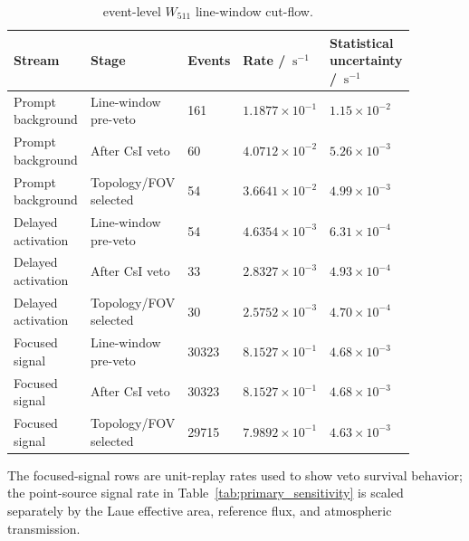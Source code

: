 \documentclass[11pt]{article}
\newcommand{\cps}{\ensuremath{\,\mathrm{s^{-1}}}}
\newcommand{\wii}{W_{511}}
\newcommand{\added}[1]{{\color{red}#1}}
\begin{document}
\begin{table}[t]
\centering
\caption{\added{event-level $\wii$ line-window cut-flow.}}
\label{tab:phase2_cutflow}
\footnotesize
{
\setlength{\tabcolsep}{3pt}
\begin{tabular}{p{0.20\linewidth}p{0.24\linewidth}p{0.08\linewidth}p{0.16\linewidth}p{0.20\linewidth}}
\toprule
Stream & Stage & Events & Rate / $\cps$ & Statistical uncertainty / $\cps$ \\
\midrule
Prompt background & Line-window pre-veto & 161 & $1.1877\times10^{-1}$ & $1.15\times10^{-2}$ \\
Prompt background & After CsI veto & 60 & $4.0712\times10^{-2}$ & $5.26\times10^{-3}$ \\
Prompt background & Topology/FOV selected & 54 & $3.6641\times10^{-2}$ & $4.99\times10^{-3}$ \\
Delayed activation & Line-window pre-veto & 54 & $4.6354\times10^{-3}$ & $6.31\times10^{-4}$ \\
Delayed activation & After CsI veto & 33 & $2.8327\times10^{-3}$ & $4.93\times10^{-4}$ \\
Delayed activation & Topology/FOV selected & 30 & $2.5752\times10^{-3}$ & $4.70\times10^{-4}$ \\
Focused signal & Line-window pre-veto & 30323 & $8.1527\times10^{-1}$ & $4.68\times10^{-3}$ \\
Focused signal & After CsI veto & 30323 & $8.1527\times10^{-1}$ & $4.68\times10^{-3}$ \\
Focused signal & Topology/FOV selected & 29715 & $7.9892\times10^{-1}$ & $4.63\times10^{-3}$ \\
\bottomrule
\end{tabular}
\par}
\vspace{0.5ex}
\begin{minipage}{0.94\linewidth}
\footnotesize
The focused-signal rows are unit-replay rates used to show veto survival
behavior; the point-source signal rate in Table~\ref{tab:primary_sensitivity}
is scaled separately by the Laue effective area, reference flux, and atmospheric
transmission.
\end{minipage}
\end{table}
\end{document}
